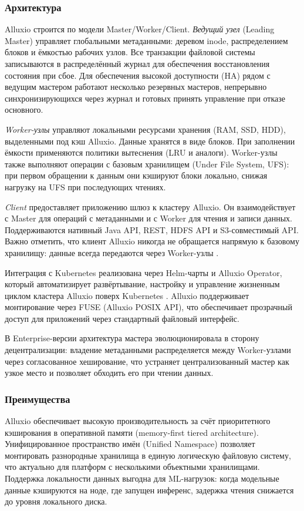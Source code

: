 \subsubsection*{Архитектура}

Alluxio строится по модели Master/Worker/Client. \textit{Ведущий узел} (Leading Master) управляет глобальными метаданными: деревом inode, распределением блоков и ёмкостью рабочих узлов. Все транзакции файловой системы записываются в распределённый журнал для обеспечения восстановления состояния при сбое. Для обеспечения высокой доступности (HA) рядом с ведущим мастером работают несколько резервных мастеров, непрерывно синхронизирующихся через журнал и готовых принять управление при отказе основного.

\textit{Worker-узлы} управляют локальными ресурсами хранения (RAM, SSD, HDD), выделенными под кэш Alluxio. Данные хранятся в виде блоков. При заполнении ёмкости применяются политики вытеснения (LRU и аналоги). Worker-узлы также выполняют операции с базовым хранилищем (Under File System, UFS): при первом обращении к данным они кэшируют блоки локально, снижая нагрузку на UFS при последующих чтениях.

\textit{Client} предоставляет приложению шлюз к кластеру Alluxio. Он взаимодействует с Master для операций с метаданными и с Worker для чтения и записи данных. Поддерживаются нативный Java API, REST, HDFS API и S3-совместимый API. Важно отметить, что клиент Alluxio никогда не обращается напрямую к базовому хранилищу: данные всегда передаются через Worker-узлы \cite{alluxio_arch}.

Интеграция с Kubernetes реализована через Helm-чарты и Alluxio Operator, который автоматизирует развёртывание, настройку и управление жизненным циклом кластера Alluxio поверх Kubernetes \cite{alluxio_k8s}. Alluxio поддерживает монтирование через FUSE (Alluxio POSIX API), что обеспечивает прозрачный доступ для приложений через стандартный файловый интерфейс.

В Enterprise-версии архитектура мастера эволюционировала в сторону децентрализации: владение метаданными распределяется между Worker-узлами через согласованное хеширование, что устраняет централизованный мастер как узкое место и позволяет обходить его при чтении данных.

\subsubsection*{Преимущества}

Alluxio обеспечивает высокую производительность за счёт приоритетного кэширования в оперативной памяти (memory-first tiered architecture). Унифицированное пространство имён (Unified Namespace) позволяет монтировать разнородные хранилища в единую логическую файловую систему, что актуально для платформ с несколькими объектными хранилищами. Поддержка локальности данных выгодна для ML-нагрузок: когда модельные данные кэшируются на ноде, где запущен инференс, задержка чтения снижается до уровня локального диска.

